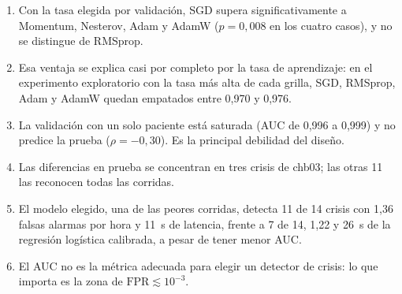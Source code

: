 \begin{enumerate}
  \item Con la tasa elegida por validación, SGD supera significativamente a Momentum, Nesterov, Adam y AdamW
        ($p = 0{,}008$ en los cuatro casos), y no se distingue de RMSprop.
  \item Esa ventaja se explica casi por completo por la tasa de aprendizaje: en el experimento exploratorio con la tasa más
        alta de cada grilla, SGD, RMSprop, Adam y AdamW quedan empatados entre 0,970 y 0,976.
  \item La validación con un solo paciente está saturada (AUC de 0,996 a 0,999) y no predice la prueba ($\rho = -0{,}30$). Es la
        principal debilidad del diseño.
  \item Las diferencias en prueba se concentran en tres crisis de chb03; las otras 11 las reconocen todas las corridas.
  \item El modelo elegido, una de las peores corridas, detecta 11 de 14 crisis con 1,36 falsas alarmas por hora y 11~s de
        latencia, frente a 7 de 14, 1,22 y 26~s de la regresión logística calibrada, a pesar de tener menor AUC.
  \item El AUC no es la métrica adecuada para elegir un detector de crisis: lo que importa es la zona de $\text{FPR} \lesssim 10^{-3}$.
\end{enumerate}
